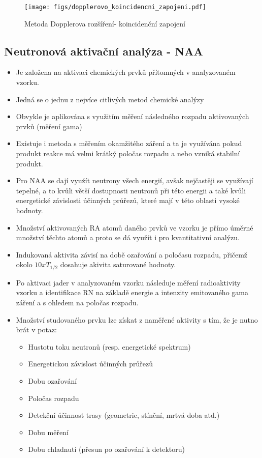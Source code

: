 \begin{figure}[ht!]
    \centering
    \texttt{[image: figs/dopplerovo\_koincidencni\_zapojeni.pdf]}
    \caption{Metoda Dopplerova rozšíření- koincidenční zapojení}
    \label{fig:6_2_pas_dopplerovo_rozsireni}
\end{figure}

\subsection{Neutronová aktivační analýza - NAA}

\begin{itemize}
    \item Je založena na aktivaci chemických prvků přítomných v analyzovaném vzorku. 
    \item Jedná se o jednu z nejvíce citlivých metod chemické analýzy
    \item Obvykle je aplikována s využitím měření následného rozpadu aktivovaných prvků (měření gama)
    \item Existuje i metoda s měřením okamžitého záření a ta je využívána pokud produkt reakce má velmi krátký poločas rozpadu a nebo vzniká stabilní produkt.
    \item Pro NAA se dají vyuźít neutrony všech energií, avšak nejčastěji se využívají tepelné, a to kvůli větší dostupnosti neutronů při této energii a také kvůli energetické závislosti účinných průřezů, které mají v této oblasti vysoké hodnoty.
    \item Množství aktivovaných RA atomů daného prvků ve vzorku je přímo úměrné množství těchto atomů a proto se dá využít i pro kvantitativní analýzu.
    \item Indukovaná aktivita závisí na době ozařování a poločasu rozpadu, přičemž okolo $10x T_{1/2}$ dosahuje akivita saturované hodnoty.
    \item Po aktivaci jader v analyzovaném vzorku následuje měření radioaktivity vzorku a identifikace RN na základě energie a intenzity emitovaného gama záření a s ohledem na poločas rozpadu.
    \item Množství studovaného prvku lze získat z naměřené aktivity s tím, že je nutno brát v potaz:
    \begin{itemize}
        \item Hustotu toku neutronů (resp. energetické spektrum)
        \item Energetickou závislost účinných průřezů
        \item Dobu ozařování
        \item Poločas rozpadu
        \item Detekční účinnost trasy (geometrie, stínění, mrtvá doba atd.)
        \item Dobu měření
        \item Dobu chladnutí (přesun po ozařování k detektoru)
    \end{itemize}
\end{itemize}
 
